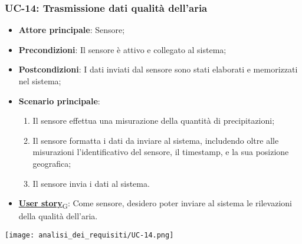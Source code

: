 \subsubsection{UC-14: Trasmissione dati qualità dell'aria}
\begin{itemize}
	\item \textbf{Attore principale}: Sensore;
	\item \textbf{Precondizioni}: Il sensore è attivo e collegato al sistema;
	\item \textbf{Postcondizioni}: I dati inviati dal sensore sono stati elaborati e memorizzati nel sistema;
	\item \textbf{Scenario principale}:
	      \begin{enumerate}
		      \item Il sensore effettua una misurazione della quantità di precipitazioni;
		      \item Il sensore formatta i dati da inviare al sistema, includendo oltre alle misurazioni l'identificativo del sensore,
		            il timestamp, e la sua posizione geografica;
		      \item Il sensore invia i dati al sistema.
	      \end{enumerate}
	\item \href{https://7last.github.io/docs/rtb/documentazione-interna/glossario\#user-story}{\textbf{User story}\textsubscript{G}}:
	      Come sensore, desidero poter inviare al sistema le rilevazioni della qualità dell'aria.
\end{itemize}

\begin{center}
	\texttt{[image: analisi\_dei\_requisiti/UC-14.png]}
\end{center}

